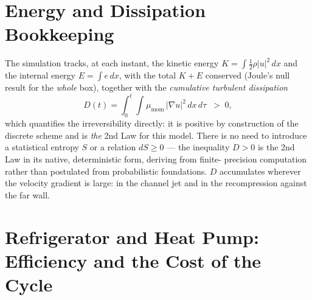 \section{Energy and Dissipation Bookkeeping}

The simulation tracks, at each instant, the kinetic energy
$K=\int\tfrac12\rho|u|^2\,dx$ and the internal energy $E=\int e\,dx$, with the
total $K+E$ conserved (Joule's null result for the \emph{whole} box), together
with the \emph{cumulative turbulent dissipation}
\begin{equation}\label{D_def}
D(t)=\int_0^t\!\!\int \mu_{\mathrm{mom}}\,|\nabla u|^2\,dx\,d\tau \;\;>\;0 ,
\end{equation}
which quantifies the irreversibility directly: it is positive by construction of
the discrete scheme and is \emph{the} 2nd Law for this model. There is no need
to introduce a statistical entropy $S$ or a relation $dS\ge 0$ --- the inequality
$D>0$ is the 2nd Law in its native, deterministic form, deriving from finite-
precision computation rather than postulated from probabilistic foundations.
$D$ accumulates wherever the velocity gradient is large: in the channel jet and
in the recompression against the far wall.

\section{Refrigerator and Heat Pump: Efficiency and the Cost of the Cycle}

